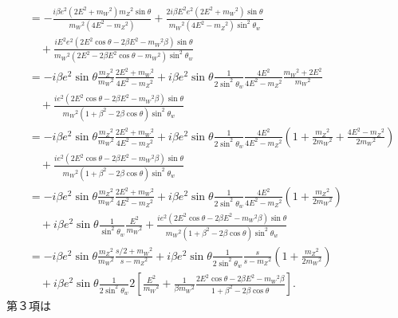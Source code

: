 \begin{align*}
  &= - \frac{i \beta e^2 \left(2 E^2 + m_W{}^2\right) m_Z{}^2 \sin\theta}{m_W{}^2 (4E^2 - m_Z{}^2)}
  + \frac{2 i \beta E^2 e^2 \left(2 E^2 + m_W{}^2\right) \sin\theta}{m_W{}^2 \left(4 E^2 - m_Z{}^2\right) \sin^2\theta_w} \\
  &\quad+ \frac{i E^2 e^2 \left(2 E^2 \cos\theta - 2 \beta E^2  - m_W{}^2 \beta \right) \sin\theta}{m_W{}^2 \left(2 E^2 - 2 \beta E^2 \cos\theta - m_W{}^2\right) \sin^2\theta_w} \\
  &= - i\beta e^2 \sin\theta \frac{m_Z{}^2}{m_W{}^2} \frac{2 E^2 + m_W{}^2}{4E^2 - m_Z{}^2}
  + i\beta e^2 \sin\theta \frac{1}{2\sin^2\theta_w} \frac{4E^2}{4E^2 - m_Z{}^2} \frac{m_W{}^2+2E^2}{m_W{}^2} \\
  &\quad+ \frac{i e^2 \left(2 E^2 \cos\theta - 2 \beta E^2  - m_W{}^2 \beta \right) \sin\theta}{m_W{}^2 \left(1 + \beta^2 - 2\beta\cos\theta\right) \sin^2\theta_w} \\
  &= - i\beta e^2 \sin\theta \frac{m_Z{}^2}{m_W{}^2} \frac{2 E^2 + m_W{}^2}{4E^2 - m_Z{}^2}
  + i\beta e^2 \sin\theta \frac{1}{2\sin^2\theta_w} \frac{4E^2}{4E^2 - m_Z{}^2} \left( 1 + \frac{m_Z{}^2}{2m_W{}^2} + \frac{4E^2-m_Z{}^2}{2m_W{}^2} \right) \\
  &\quad+ \frac{i e^2 \left(2 E^2 \cos\theta - 2 \beta E^2  - m_W{}^2 \beta \right) \sin\theta}{m_W{}^2 \left(1 + \beta^2 - 2\beta\cos\theta\right) \sin^2\theta_w} \\
  &= - i\beta e^2 \sin\theta \frac{m_Z{}^2}{m_W{}^2} \frac{2 E^2 + m_W{}^2}{4E^2 - m_Z{}^2}
  + i\beta e^2 \sin\theta \frac{1}{2\sin^2\theta_w} \frac{4E^2}{4E^2 - m_Z{}^2} \left( 1 + \frac{m_Z{}^2}{2m_W{}^2} \right) \\
  &\quad + i\beta e^2 \sin\theta \frac{1}{\sin^2\theta_w} \frac{E^2}{m_W{}^2}
  + \frac{i e^2 \left(2 E^2 \cos\theta - 2 \beta E^2  - m_W{}^2 \beta \right) \sin\theta}{m_W{}^2 \left(1 + \beta^2 - 2\beta\cos\theta\right) \sin^2\theta_w} \\
  &= - i\beta e^2 \sin\theta \frac{m_Z{}^2}{m_W{}^2} \frac{s/2 + m_W{}^2}{s - m_Z{}^2}
  + i\beta e^2 \sin\theta \frac{1}{2\sin^2\theta_w} \frac{s}{s - m_Z{}^2} \left( 1 + \frac{m_Z{}^2}{2m_W{}^2} \right) \\
  &\quad + i\beta e^2 \sin\theta \frac{1}{2\sin^2\theta_w}
  2 \left[ \frac{E^2}{m_W{}^2} + \frac{1}{\beta m_W{}^2} \frac{2 E^2 \cos\theta - 2 \beta E^2  - m_W{}^2 \beta}{1 + \beta^2 - 2\beta\cos\theta} \right] .
\end{align*}
第３項は
